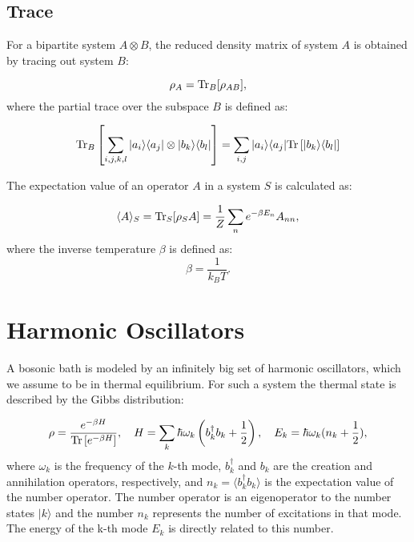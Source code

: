 
\subsection{Trace}
For a bipartite system \( A \otimes B \), the reduced density matrix of system \( A \) is obtained by tracing out system \( B \):

\begin{equation} \label{eq:partial_trace}
	\rho_A = \mathrm{Tr}_B[\rho_{AB}],
\end{equation}
where the partial trace over the subspace \( B \) is defined as:

\begin{equation} \label{eq:partial_trace_definition}
	\mathrm{Tr}_B\left[\sum_{i,j,k,l} | a_i \rangle \langle a_j | \otimes | b_k \rangle \langle b_l | \right] = \sum_{i,j} | a_i \rangle \langle a_j | \mathrm{Tr}\left[ | b_k \rangle \langle b_l | \right]
\end{equation}

The expectation value of an operator \( A \) in a system \( S \) is calculated as:

\begin{equation} \label{eq:expectation_value}
	\langle A \rangle_S = \mathrm{Tr}_S[\rho_S A] = \frac{1}{Z} \sum_n e^{-\beta E_n} A_{nn},
\end{equation}
where the inverse temperature \(\beta\) is defined as:
\begin{equation} \label{eq:beta_definition}
	\beta = \frac{1}{k_B T}.
\end{equation}


\section{Harmonic Oscillators}
A bosonic bath is modeled by an infinitely big set of harmonic oscillators, which we assume to be in thermal equilibrium.
For such a system the thermal state is described by the Gibbs distribution:

\begin{equation} \label{eq:gibbs_state}
	\rho = \frac{e^{-\beta H}}{\mathrm{Tr}\left[e^{-\beta H}\right]}, \quad H = \sum_k \hbar \omega_k \left(b_k^{\dagger} b_k + \frac{1}{2}\right), \quad E_k = \hbar \omega_k (n_k + \frac{1}{2}),
\end{equation}
where \( \omega_k \) is the frequency of the \( k \)-th mode, \( b_k^{\dagger} \) and \( b_k \) are the creation and annihilation operators, respectively, and \( n_k = \langle b_k^{\dagger} b_k \rangle \) is the expectation value of the  number operator. 
The number operator is an eigenoperator to the number states \(|k\rangle\)
and the number $n_k$ represents the number of excitations in that mode.
The energy of the k-th mode $ E_k $ is directly related to this number.

